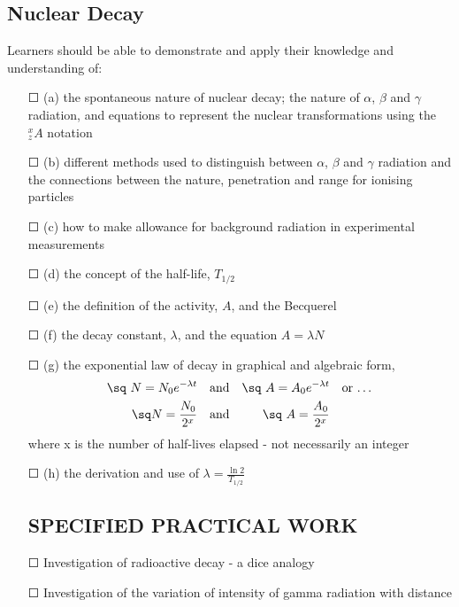 \subsection{Nuclear Decay}Learners should be able to demonstrate and apply their knowledge and
understanding of:
\begin{itemize}
	\item[\Large{$\Square$}] (a) the spontaneous nature of nuclear decay; the nature of $\alpha$, $\beta$ and $\gamma$ radiation, and	equations to represent the nuclear transformations using the $_{z}^{x}A $ notation
	\item[\Large{$\Square$}]	(b) different methods used to distinguish between $\alpha$, $\beta$ and $\gamma$ radiation and the connections between the nature, penetration and range for ionising particles
	\item[\Large{$\Square$}]	(c) how to make allowance for background radiation in experimental measurements
	\item[\Large{$\Square$}]	(d) the concept of the half-life, $T_{1/2}$
	\item[\Large{$\Square$}]	(e) the definition of the activity, \(A\), and the Becquerel
	\item[\Large{$\Square$}]	(f) the decay constant, \( \lambda \), and the equation \( A= \lambda N \)
	\item[\Large{$\Square$}]	(g) the exponential law of decay in graphical and algebraic form, 
	\begin{align*}
	\text{\sq }N=N_{0}e^{- \lambda t}  & &\text{and} & &\text{\sq }A=A_{0}e^{-\lambda t}& &\text{or \ldots}\\
	\text{\sq}N=\frac{N_{0}}{2^{x}} & &\text{and}& &\text{\sq }A=\frac{A_{0}}{2^{x}}
	\end{align*}
	where x is the number of half-lives elapsed - not necessarily an integer
	\item[\Large{$\Square$}]	(h) the derivation and use of \( \lambda=\frac{\ln 2}{T_{1/2}}  \)
	\subsection*{SPECIFIED PRACTICAL WORK}
	\item[\Large{$\Square$}] Investigation of radioactive decay - a dice analogy
	\item[\Large{$\Square$}] Investigation of the variation of intensity of gamma radiation with distance
\end{itemize}
